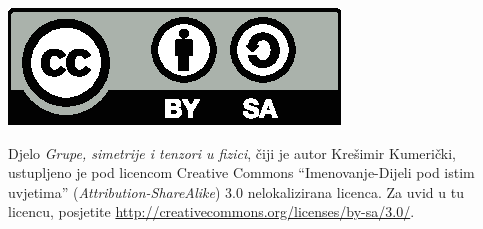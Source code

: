 
\thispagestyle{empty}

\vspace*{22em}

\centerline{\includegraphics[scale=1.0,clip]{pics/by-sa.eps}}
Djelo \emph{Grupe, simetrije i tenzori u fizici}, čiji je autor Krešimir
Kumerički, ustupljeno je pod licencom Creative Commons 
``Imenovanje-Dijeli pod istim uvjetima'' (\emph{Attribution-ShareAlike}) 
3.0 nelokalizirana licenca.
Za uvid u tu licencu, posjetite
\url{http://creativecommons.org/licenses/by-sa/3.0/}.

